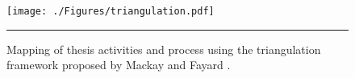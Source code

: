 \begin{figure}[t]
	\centering
		\texttt{[image: ./Figures/triangulation.pdf]}
		\rule{35em}{0.5pt}
	\caption[Triangulation]{Mapping of thesis activities and process using the triangulation framework proposed by Mackay and Fayard \cite{mackay_hci_1997}.}
	\label{fig:triangulation}
\end{figure}















